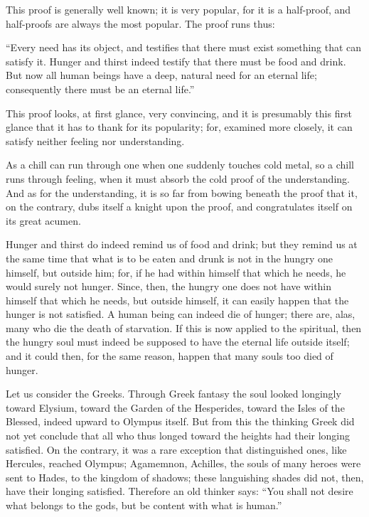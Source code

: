 \documentclass[12pt,a4paper]{book}
\begin{document}
This proof is generally well known; it is very popular, for it is a half-proof, and half-proofs are always the most popular. The proof runs thus:

``Every need has its object, and testifies that there must exist something that can satisfy it. Hunger and thirst indeed testify that there must be food and drink. But now all human beings have a deep, natural need for an eternal life; consequently there must be an eternal life.''

This proof looks, at first glance, very convincing, and it is presumably this first glance that it has to thank for its popularity; for, examined more closely, it can satisfy neither feeling nor understanding.

As a chill can run through one when one suddenly touches cold metal, so a chill runs through feeling, when it must absorb the cold proof of the understanding. And as for the understanding, it is so far from bowing beneath the proof that it, on the contrary, dubs itself a knight upon the proof, and congratulates itself on its great acumen.

Hunger and thirst do indeed remind us of food and drink; but they remind us at the same time that what is to be eaten and drunk is not in the hungry one himself, but outside him; for, if he had within himself that which he needs, he would surely not hunger. Since, then, the hungry one does not have within himself that which he needs, but outside himself, it can easily happen that the hunger is not satisfied. A human being can indeed die of hunger; there are, alas, many who die the death of starvation. If this is now applied to the spiritual, then the hungry
soul must indeed be supposed to have the eternal life outside itself; and it could then, for the same reason, happen that many souls too died of hunger.

Let us consider the Greeks. Through Greek fantasy the soul looked longingly toward Elysium, toward the Garden of the Hesperides, toward the Isles of the Blessed, indeed upward to Olympus itself. But from this the thinking Greek did not yet conclude that all who thus longed toward the heights had their longing satisfied. On the contrary, it was a rare exception that distinguished ones, like Hercules, reached Olympus; Agamemnon, Achilles, the souls of many heroes were sent to Hades, to the kingdom of shadows; these languishing shades did not, then, have their longing satisfied. Therefore an old thinker says: ``You shall not desire what belongs to the gods, but be content with what is human.''
\end{document}
